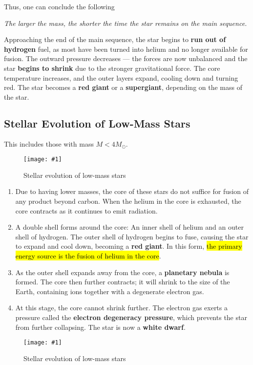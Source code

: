 \documentclass[a4paper,12pt]{article}
\newcommand{\img}[4]{\begin{center}
  \begin{figure}[H]
    \centering
    \texttt{[image: \#1]}
    \caption{#3}
    \label{fig:#4}
  \end{figure}
\end{center}}
\begin{document}
Thus, one can conclude the following

\begin{center}
  \textit{The larger the mass, the shorter the time the star remains on the main sequence.}
\end{center}

Approaching the end of the main sequence, the star begins to \textbf{run out of hydrogen} fuel, as most have been turned into helium and no longer available for fusion. The outward pressure decreases --- the forces are now unbalanced and the star \textbf{begins to shrink} due to the stronger gravitational force. The core temperature increases, and the outer layers expand, cooling down and turning red. The star becomes a \textbf{red giant} or a \textbf{supergiant}, depending on the mass of the star.



\subsection{Stellar Evolution of Low-Mass Stars}

This includes those with mass $M < 4M_{\odot}$.
\img{lowmass1.png}{1}{Stellar evolution of low-mass stars}{lowmass1}
\begin{enumerate}
  \item Due to having lower masses, the core of these stars do not suffice for fusion of any product beyond carbon. When the helium in the core is exhausted, the core contracts as it continues to emit radiation.
  \item A double shell forms around the core: An inner shell of helium and an outer shell of hydrogen. The outer shell of hydrogen begins to fuse, causing the star to expand and cool down, becoming a \textbf{red giant}. In this form, \hl{the primary energy source is the fusion of helium in the core}.
  \item As the outer shell expands away from the core, a \textbf{planetary nebula} is formed. The core then further contracts; it will shrink to the size of the Earth, containing ions together with a degenerate electron gas.
  \item At this stage, the core cannot shrink further. The electron gas exerts a pressure called the \textbf{electron degeneracy pressure}, which prevents the star from further collapsing. The star is now a \textbf{white dwarf}.
\end{enumerate}

\img{lowmass.png}{1}{Stellar evolution of low-mass stars}{lowmass}
\end{document}
